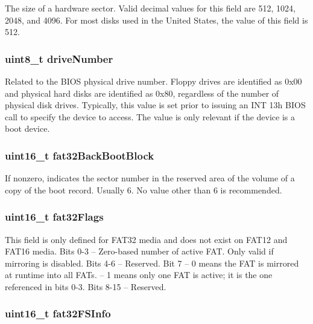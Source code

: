 The size of a hardware sector. Valid decimal values for this field are 512, 1024, 2048, and 4096. For most disks used in the United States, the value of this field is 512. \hypertarget{structfat32__boot_aa7c65fdb4f759fca094105d1c870bcb2}{
\subsubsection[{drive\-Number}]{\setlength{\rightskip}{0pt plus 5cm}uint8\-\_\-t drive\-Number}}\label{structfat32__boot_aa7c65fdb4f759fca094105d1c870bcb2}
Related to the B\-I\-O\-S physical drive number. Floppy drives are identified as 0x00 and physical hard disks are identified as 0x80, regardless of the number of physical disk drives. Typically, this value is set prior to issuing an I\-N\-T 13h B\-I\-O\-S call to specify the device to access. The value is only relevant if the device is a boot device. \hypertarget{structfat32__boot_a1914baf34756efd18072059dccfcf40f}{
\subsubsection[{fat32\-Back\-Boot\-Block}]{\setlength{\rightskip}{0pt plus 5cm}uint16\-\_\-t fat32\-Back\-Boot\-Block}}\label{structfat32__boot_a1914baf34756efd18072059dccfcf40f}
If nonzero, indicates the sector number in the reserved area of the volume of a copy of the boot record. Usually 6. No value other than 6 is recommended. \hypertarget{structfat32__boot_a4f864cefb7f1b004d5739ffab9a65ae1}{
\subsubsection[{fat32\-Flags}]{\setlength{\rightskip}{0pt plus 5cm}uint16\-\_\-t fat32\-Flags}}\label{structfat32__boot_a4f864cefb7f1b004d5739ffab9a65ae1}
This field is only defined for F\-A\-T32 media and does not exist on F\-A\-T12 and F\-A\-T16 media. Bits 0-\/3 -- Zero-\/based number of active F\-A\-T. Only valid if mirroring is disabled. Bits 4-\/6 -- Reserved. Bit 7 -- 0 means the F\-A\-T is mirrored at runtime into all F\-A\-Ts. -- 1 means only one F\-A\-T is active; it is the one referenced in bits 0-\/3. Bits 8-\/15 -- Reserved. \hypertarget{structfat32__boot_aad3222ea255af06d09734e96a93c82ed}{
\subsubsection[{fat32\-F\-S\-Info}]{\setlength{\rightskip}{0pt plus 5cm}uint16\-\_\-t fat32\-F\-S\-Info}}\label{structfat32__boot_aad3222ea255af06d09734e96a93c82ed}
